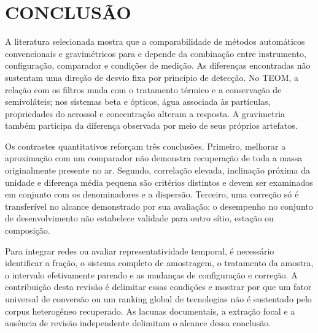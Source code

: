 \section{CONCLUSÃO}

A literatura selecionada mostra que a comparabilidade de métodos automáticos convencionais e gravimétricos para \MPdez{} e \MPdoiscinco{} depende da combinação entre instrumento, configuração, comparador e condições de medição. As diferenças encontradas não sustentam uma direção de desvio fixa por princípio de detecção. No TEOM, a relação com os filtros muda com o tratamento térmico e a conservação de semivoláteis; nos sistemas beta e ópticos, água associada às partículas, propriedades do aerossol e concentração alteram a resposta. A gravimetria também participa da diferença observada por meio de seus próprios artefatos.

Os contrastes quantitativos reforçam três conclusões. Primeiro, melhorar a aproximação com um comparador não demonstra recuperação de toda a massa originalmente presente no ar. Segundo, correlação elevada, inclinação próxima da unidade e diferença média pequena são critérios distintos e devem ser examinados em conjunto com os denominadores e a dispersão. Terceiro, uma correção só é transferível no alcance demonstrado por sua avaliação; o desempenho no conjunto de desenvolvimento não estabelece validade para outro sítio, estação ou composição.

Para integrar redes ou avaliar representatividade temporal, é necessário identificar a fração, o sistema completo de amostragem, o tratamento da amostra, o intervalo efetivamente pareado e as mudanças de configuração e correção. A contribuição desta revisão é delimitar essas condições e mostrar por que um fator universal de conversão ou um ranking global de tecnologias não é sustentado pelo corpus heterogêneo recuperado. As lacunas documentais, a extração focal e a ausência de revisão independente delimitam o alcance dessa conclusão.
